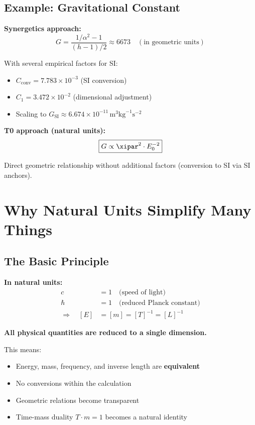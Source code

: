 	\subsection{Example: Gravitational Constant}
	
	\textbf{Synergetics approach:}
	\begin{equation}
		G = \frac{1/\alpha^2 - 1}{(h - 1)/2} \approx 6673 \quad (\text{in geometric units})
	\end{equation}
	
	With several empirical factors for SI:
	\begin{itemize}
		\item $C_{\text{conv}} = 7.783 \times 10^{-3}$ (SI conversion)
		\item $C_1 = 3.472 \times 10^{-2}$ (dimensional adjustment)
		\item Scaling to $G_{\text{SI}} \approx 6.674 \times 10^{-11} \, \text{m}^3 \text{kg}^{-1} \text{s}^{-2}$
	\end{itemize}
	
	\textbf{T0 approach (natural units):}
	\begin{equation}
		\boxed{G \propto \xipar^2 \cdot E_0^{-2}}
	\end{equation}
	
	Direct geometric relationship without additional factors (conversion to SI via SI anchors).
	
	\section{Why Natural Units Simplify Many Things}
	
	\subsection{The Basic Principle}
	
	\begin{vorteil}
		\textbf{In natural units:}
		\begin{align}
			c &= 1 \quad \text{(speed of light)} \\
			\hbar &= 1 \quad \text{(reduced Planck constant)} \\
			\Rightarrow \quad [E] &= [m] = [T]^{-1} = [L]^{-1}
		\end{align}
		
		\textbf{All physical quantities are reduced to a single dimension.}
		
		This means:
		\begin{itemize}
			\item Energy, mass, frequency, and inverse length are \textbf{equivalent}
			\item No conversions within the calculation
			\item Geometric relations become transparent
			\item Time-mass duality $T \cdot m = 1$ becomes a natural identity
		\end{itemize}
	\end{vorteil}
	
